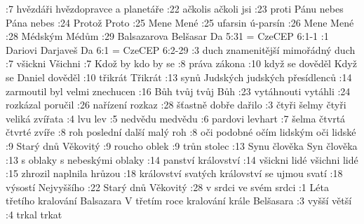 :7  {hvězdáři} {} {} {hvězdopravce a planetáře} {} {}
:22 {ačkolis} {} {} {ačkoli jsi} {} {}
:23 {proti Pánu nebes} {} {} {Pána nebes} {} {}
:24 {Protož} {} {} {Proto} {} {}
:25 {Mene} {} {} {Mené} {} {}
:25 {ufarsin} {} {} {ú-parsín} {} {}
:26 {Mene} {} {} {Mené} {} {}
:28 {Médským} {} {} {Médům} {} {}
:29 {Balsazarova} {} {} {Belšasar} {} {}
\renum Da 5:31 = CzeCEP 6:1-1
:1  {Dariovi} {} {} {Darjaveš} {} {}
\renum Da 6:1 = CzeCEP 6:2-29
:3  {duch znamenitější} {} {} {mimořádný duch} {} {}
:7  {všickni} {} {} {Všichni} {} {}
:7  {Kdož by} {} {} {kdo by se} {} {}
:8  {práva} {} {} {zákona} {} {}
:10 {když se dověděl} {} {} {Když se Daniel dověděl} {} {}
:10 {třikrát} {} {} {Třikrát} {} {}
:13 {synů Judských} {} {} {judských přesídlenců} {} {}
:14 {zarmoutil} {} {} {byl velmi znechucen} {} {}
:16 {Bůh tvůj} {} {} {tvůj Bůh} {} {}
:23 {vytáhnouti} {} {} {vytáhli} {} {}
:24 {rozkázal} {} {} {poručil} {} {}
:26 {nařízení} {} {} {rozkaz} {} {}
:28 {šťastně} {} {} {dobře dařilo} {} {}
:3  {čtyři šelmy} {} {} {čtyři veliká zvířata} {} {}
:4  {lvu} {} {} {lev} {} {}
:5  {nedvědu} {} {} {medvědu} {} {}
:6  {pardovi} {} {} {levhart} {} {}
:7  {šelma čtvrtá} {} {} {čtvrté zvíře} {} {}
:8  {roh poslední} {} {} {další malý roh} {} {}
:8  {oči podobné očím lidským} {} {} {oči lidské} {} {}
:9  {Starý dnů} {} {} {Věkovitý} {} {}
:9  {roucho} {} {} {oblek} {} {}
:9  {trůn} {} {} {stolec} {} {}
:13 {Synu člověka} {} {} {Syn člověka} {} {}
:13 {s oblaky} {} {} {s nebeskými oblaky} {} {}
:14 {panství} {} {} {království} {} {}
:14 {všickni lidé} {} {} {všichni lidé} {} {}
:15 {zhrozil} {} {} {naplnila hrůzou} {} {}
:18 {království svatých} {} {} {království se ujmou svatí} {} {}
:18 {výsostí} {} {} {Nejvyššího} {} {}
:22 {Starý dnů} {} {} {Věkovitý} {} {}
:28 {v srdci} {} {} {ve svém srdci} {} {}
:1  {Léta třetího kralování Balsazara} {} {} {V třetím roce kralování krále Belšasara} {} {}
:3  {vyšší} {} {} {větší} {} {}
:4  {trkal} {} {} {trkat} {} {}
